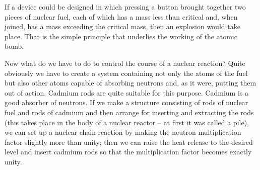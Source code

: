 If a device could be designed in which pressing a button brought together two pieces of nuclear fuel, each of which has a mass less than critical and, when joined, has a mass exceeding the critical mass, then an explosion would take place. That is the simple principle that underlies the working of the atomic bomb.

Now what do we have to do to control the course of a nuclear reaction? Quite obviously we have to create a system containing not only the atoms of the fuel but also other atoms capable of absorbing neutrons and, as it were, putting them out of action. Cadmium rods are quite suitable for this purpose. Cadmium is a good ab­sorber of neutrons. If we make a structure consisting of rods of nuclear fuel and rods of cadmium and then arrange for inserting and extracting the rods (this takes place in the body of a nuclear reactor -- at first it was called a pile), we can set up a nuclear chain reaction by making the neutron multiplication factor slightly more than uni­ty; then we can raise the heat release to the desired level and insert cadmium rods so that the multiplication factor becomes exactly unity.


%



